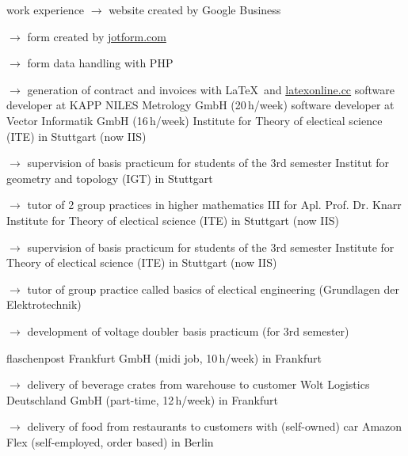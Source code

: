 \begin{rubric}{\textcolor{black!20!blue!100}{work experience}}
			\setlength{\hangindent}{\widthof{$\rightarrow$ }}
			$\rightarrow$ website created by Google Business

			$\rightarrow$ form created by \href{https://www.jotform.com/}{jotform.com}

			$\rightarrow$ form data handling with PHP

			$\rightarrow$ generation of contract and invoices with \LaTeX\ and \href{https://latexonline.cc/}{latexonline.cc}
%			
		\entry*[10/2024 --- 01/2025]
			software developer at KAPP NILES Metrology GmbH (20\,h/week)
		\entry*[05/2016 --- 10/2017]
			software developer at Vector Informatik GmbH (16\,h/week)
		\entry*[10/2015 --- 03/2016]
			Institute for Theory of electical science (ITE) in Stuttgart (now IIS)
				
			\setlength{\hangindent}{\widthof{$\rightarrow$ }}
			$\rightarrow$ supervision of basis practicum for students of the 3rd semester
		\entry*
			Institut for geometry and topology (IGT) in Stuttgart
			
			\setlength{\hangindent}{\widthof{$\rightarrow$ }}
			$\rightarrow$ tutor of 2 group practices in higher mathematics III for Apl. Prof. Dr. Knarr
		\entry*[10/2014 --- 03/2015]
			Institute for Theory of electical science (ITE) in Stuttgart (now IIS)
			
			\setlength{\hangindent}{\widthof{$\rightarrow$ }}
			$\rightarrow$ supervision of basis practicum for students of the 3rd semester
		\entry*[10/2013 --- 03/2014]
			Institute for Theory of electical science (ITE) in Stuttgart (now IIS)
			
			\setlength{\hangindent}{\widthof{$\rightarrow$ }}
			$\rightarrow$ tutor of group practice called basics of electical engineering (\glqq Grundlagen der Elektrotechnik\grqq)
			
			$\rightarrow$ development of voltage doubler basis practicum (for 3rd semester)
	
		\entry*[23/03/2024 --- 26/04/2024]
			flaschenpost Frankfurt GmbH (midi job, 10\,h/week) in Frankfurt
			
			\setlength{\hangindent}{\widthof{$\rightarrow$ }}
			$\rightarrow$ delivery of beverage crates from warehouse to customer
		\entry*[06/03/2024 --- 30/04/2024]
			Wolt Logistics Deutschland GmbH (part-time, 12\,h/week) in Frankfurt
			
			\setlength{\hangindent}{\widthof{$\rightarrow$ }}
			$\rightarrow$ delivery of food from restaurants to customers with (self-owned) car
		\entry*[09/11/2020 --- 06/2022]
			Amazon Flex (self-employed, order based) in Berlin
			

\end{rubric}
